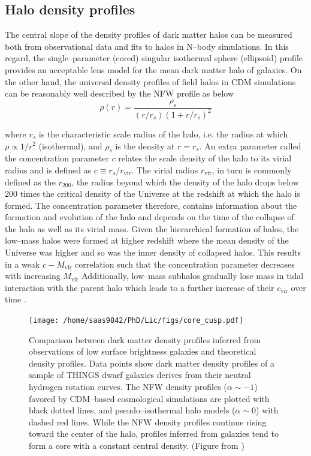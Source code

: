 \documentclass[a4wide,12pt]{book}
\begin{document}
\subsection*{Halo density profiles}
The central slope of the density profiles of dark matter halos can be measured both from observational data and fits to halos in N--body simulations. In this regard, the single--parameter (cored) singular isothermal sphere (ellipsoid) profile provides an acceptable lens model for the mean dark matter halo of galaxies. On the other hand, the universal density profiles of field halos in CDM simulations can be reasonably well described by the NFW profile as below
\begin{equation}
\label{eq:NFW}
\rho(r)=\frac{\rho_\mathrm{s}}{(r/r_s)(1+r/r_s)^{2}}
\end{equation}

where $r_s$ is the characteristic scale radius of the halo, i.e. the radius at which $\rho \propto 1/r^2$ (isothermal), and $\rho_s$ is the density at $r=r_s$. An extra parameter called the concentration parameter $c$ relates the scale density of the halo to its virial radius and is defined as $c\equiv r_s/r_\mathrm{vir}$. The virial radius $r_\mathrm{vir}$, in turn is commonly defined as the $r_{200}$, the radius beyond which the density of the halo drops below 200 times the critical density of the Universe at the redshift at which the halo is formed. The concentration parameter therefore, contains information about the formation and evolution of the halo and depends on the time of the collapse of the halo as well as its virial mass. Given the hierarchical formation of halos, the low--mass halos were formed at higher redshift where the mean density of the Universe was higher and so was the inner density of collapsed halos. This results in a weak $c-M_\mathrm{vir}$ correlation such that the concentration parameter decreases with increasing $M_\mathrm{vir}$
  Additionally, low--mass subhalos gradually lose mass in tidal interaction with the parent halo which leads to a further increase of their $c_\mathrm{vir}$ over time \citep{Bullock+2001, Maccio+2008}.

\begin{figure}

\centering
\texttt{[image: /home/saas9842/PhD/Lic/figs/core\_cusp.pdf]} %
\caption{Comparison between dark matter density profiles inferred from observations of low surface brightness galaxies and theoretical density profiles. Data points show dark matter density profiles of a sample of THINGS dwarf galaxies derives from their neutral hydrogen rotation curves. The NFW density profiles ($\alpha\sim -1$) favored by CDM--based cosmological simulations are plotted with black dotted lines, and pseudo--isothermal halo models ($\alpha\sim 0$) with dashed red lines. While the NFW density profiles continue rising toward the center of the halo, profiles inferred from galaxies tend to form a core with a constant central density. (Figure from \citealt[][]{Oh+2011})}
\label{fig:core_cusp}
\end{figure}
\end{document}
